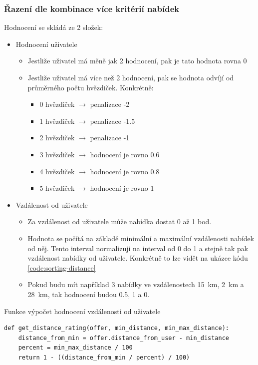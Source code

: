 \subsubsection{Řazení dle kombinace více kritérií nabídek}
Hodnocení se skládá ze 2 složek:
\begin{itemize}
	\item Hodnocení uživatele
        \begin{itemize}
            \item Jestliže uživatel má měně jak 2 hodnocení, pak je tato hodnota rovna 0
            \item Jestliže uživatel má více než 2 hodnocení, pak se hodnota odvíjí od průměrného počtu hvězdiček. Konkrétně:
            \begin{itemize}
                \item 0 hvězdiček $\rightarrow$ penalizace -2
                \item 1 hvězdiček $\rightarrow$ penalizace -1.5
                \item 2 hvězdiček $\rightarrow$ penalizace -1
                \item 3 hvězdiček $\rightarrow$ hodnocení je rovno 0.6
                \item 4 hvězdiček $\rightarrow$ hodnocení je rovno 0.8
                \item 5 hvězdiček $\rightarrow$ hodnocení je rovno 1
            \end{itemize}
        \end{itemize}
	\item Vzdálenost od uživatele
        \begin{itemize}
            \item Za vzdálenost od uživatele může nabídka dostat 0 až 1 bod.
            \item Hodnota se počítá na základě minimální a maximální vzdálenosti nabídek od něj. Tento interval normalizuji na interval od 0 do 1 a stejně tak pak vzdálenost nabídky od uživatele. Konkrétně to lze vidět na ukázce kódu \ref{code:sorting-distance}
            \item Pokud budu mít například 3 nabídky ve vzdálenostech 15~km, 2~km a 28~km, tak hodnocení budou 0.5, 1 a 0.
        \end{itemize}
\end{itemize}

\begin{listing}[htbp]
\caption{\label{code:sorting-distance}Funkce výpočet hodnocení vzdálenosti od uživatele}
\begin{verbatim}
def get_distance_rating(offer, min_distance, min_max_distance):
    distance_from_min = offer.distance_from_user - min_distance
    percent = min_max_distance / 100
    return 1 - ((distance_from_min / percent) / 100)
\end{verbatim}
\end{listing}

